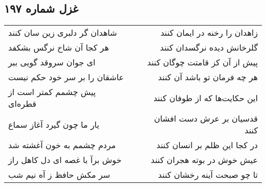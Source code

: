 \begin{center}
\section*{غزل شماره ۱۹۷}
\label{sec:sh197}
\begin{longtable}{l p{0.5cm} r}
شاهدان گر دلبری زین سان کنند
&&
زاهدان را رخنه در ایمان کنند
\\
هر کجا آن شاخ نرگس بشکفد
&&
گلرخانش دیده نرگسدان کنند
\\
ای جوان سروقد گویی ببر
&&
پیش از آن کز قامتت چوگان کنند
\\
عاشقان را بر سر خود حکم نیست
&&
هر چه فرمان تو باشد آن کنند
\\
پیش چشمم کمتر است از قطره‌ای
&&
این حکایت‌ها که از طوفان کنند
\\
یار ما چون گیرد آغاز سماع
&&
قدسیان بر عرش دست افشان کنند
\\
مردم چشمم به خون آغشته شد
&&
در کجا این ظلم بر انسان کنند
\\
خوش برآ با غصه ای دل کاهل راز
&&
عیش خوش در بوته هجران کنند
\\
سر مکش حافظ ز آه نیم شب
&&
تا چو صبحت آینه رخشان کنند
\\
\end{longtable}
\end{center}
